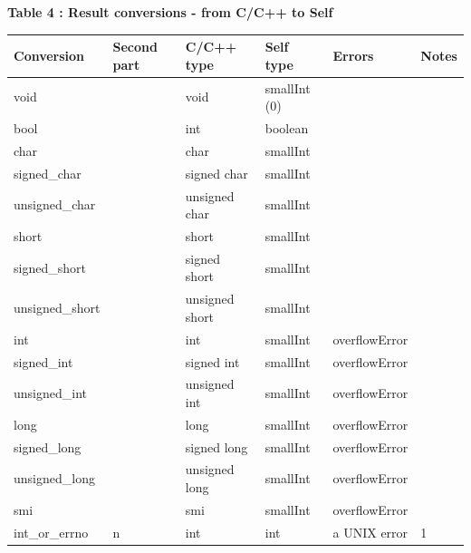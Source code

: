 \documentclass[letterpaper,10pt,english]{sphinxmanual}
\begin{document}
\textbf{Table 4 : Result conversions - from C/C++ to Self}

\begin{tabulary}{\linewidth}{p{2cm} p{2cm} p{2cm} p{2cm} p{2cm} p{2cm}}
\hline
\textbf{
Conversion
} & \textbf{
Second part
} & \textbf{
C/C++ type
} & \textbf{
Self type
} & \textbf{
Errors
} & \textbf{
Notes
}\\\hline

void
 &  & 
void
 & 
smallInt (0)
 &  & \\\hline

bool
 &  & 
int
 & 
boolean
 &  & \\\hline

char
 &  & 
char
 & 
smallInt
 &  & \\\hline

signed\_char
 &  & 
signed char
 & 
smallInt
 &  & \\\hline

unsigned\_char
 &  & 
unsigned char
 & 
smallInt
 &  & \\\hline

short
 &  & 
short
 & 
smallInt
 &  & \\\hline

signed\_short
 &  & 
signed short
 & 
smallInt
 &  & \\\hline

unsigned\_short
 &  & 
unsigned short
 & 
smallInt
 &  & \\\hline

int
 &  & 
int
 & 
smallInt
 & 
overflowError
 & \\\hline

signed\_int
 &  & 
signed int
 & 
smallInt
 & 
overflowError
 & \\\hline

unsigned\_int
 &  & 
unsigned int
 & 
smallInt
 & 
overflowError
 & \\\hline

long
 &  & 
long
 & 
smallInt
 & 
overflowError
 & \\\hline

signed\_long
 &  & 
signed long
 & 
smallInt
 & 
overflowError
 & \\\hline

unsigned\_long
 &  & 
unsigned long
 & 
smallInt
 & 
overflowError
 & \\\hline

smi
 &  & 
smi
 & 
smallInt
 & 
overflowError
 & \\\hline

int\_or\_errno
 & 
n
 & 
int
 & 
int
 & 
a UNIX error
 & 
1
\\\hline


\end{tabulary}
\end{document}
